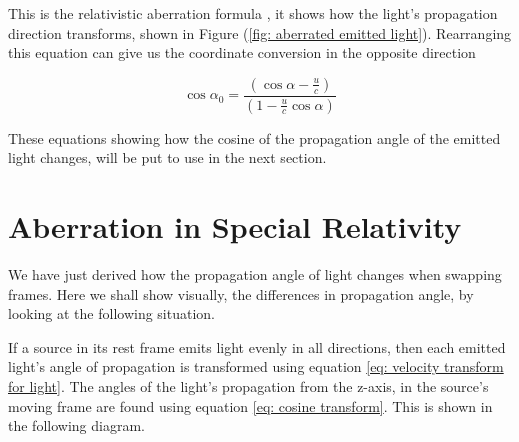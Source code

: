 This is the relativistic aberration formula \cite{einstein1905electrodynamics}, it shows how the light's propagation direction transforms, shown in Figure (\ref{fig: aberrated emitted light}).
Rearranging this equation can give us the coordinate conversion in the opposite direction

\begin{equation}
	\label{eq: inverse cosine transform}
	\cos\alpha_0 = \dfrac{ \left( \cos\alpha - \frac{u}{c} \right)}{\left(1 - \frac{u}{c} \cos\alpha\right) }
\end{equation}

These equations showing how the cosine of the propagation angle of the emitted light changes, will be put to use in the next section.

\section{Aberration in Special Relativity} \label{sect: Aberration in Special Relativity}

We have just derived how the propagation angle of light changes when swapping frames.
Here we shall show visually, the differences in propagation angle, by looking at the following situation.

If a source in its rest frame emits light evenly in all directions, then each emitted light's angle of propagation is transformed using equation \eqref{eq: velocity transform for light}.
The angles of the light's propagation from the z-axis, in the source's moving frame are found using equation \eqref{eq: cosine transform}.
This is shown in the following diagram.

